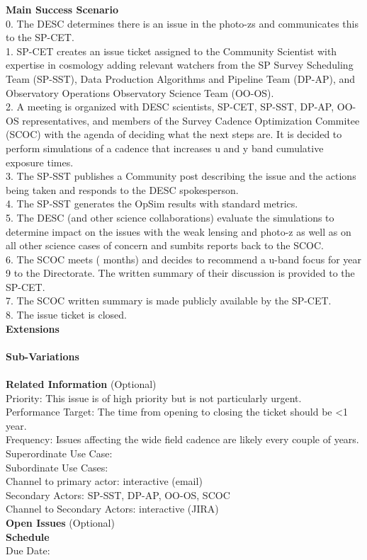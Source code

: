 {\bf Main Success Scenario} \\
0. The DESC determines there is an issue in the photo-zs and communicates this to the SP-CET. \\
1. SP-CET creates an issue ticket assigned to the Community Scientist with expertise in cosmology adding relevant watchers from the SP Survey Scheduling Team (SP-SST), Data Production Algorithms and Pipeline Team (DP-AP), and Observatory Operations Observatory Science Team (OO-OS). \\
2. A meeting is organized with DESC scientists, SP-CET, SP-SST, DP-AP, OO-OS representatives, and members of the Survey Cadence Optimization Commitee (SCOC) with the agenda of deciding what the next steps are. It is decided to perform simulations of a cadence that increases u and y band cumulative exposure times. \\
3. The SP-SST publishes a Community post describing the issue and the actions being taken and responds to the DESC spokesperson. \\
4. The SP-SST generates the OpSim results with standard metrics. \\ 
5. The DESC (and other science collaborations) evaluate the simulations to determine impact on the issues with the weak lensing and photo-z as well as on all other science cases of concern and sumbits reports back to the SCOC. \\
6. The SCOC meets ( months) and decides to recommend a u-band focus for year 9 to the Directorate. The written summary of their discussion is provided to the SP-CET. \\
7. The SCOC written summary is made publicly available by the SP-CET. \\
8. The issue ticket is closed. \\


{\bf Extensions} \\
\\

{\bf Sub-Variations} \\
\\

{\bf Related Information} (Optional) \\
Priority: This issue is of high priority but is not particularly urgent. \\
Performance Target: The time from opening to closing the ticket should be <1 year. \\
Frequency: Issues affecting the wide field cadence are likely every couple of years. \\
Superordinate Use Case:  \\
Subordinate Use Cases: \\
Channel to primary actor: interactive (email) \\
Secondary Actors: SP-SST, DP-AP, OO-OS, SCOC \\
Channel to Secondary Actors: interactive (JIRA) \\

{\bf Open Issues} (Optional) \\

{\bf Schedule} \\
Due Date: \\
